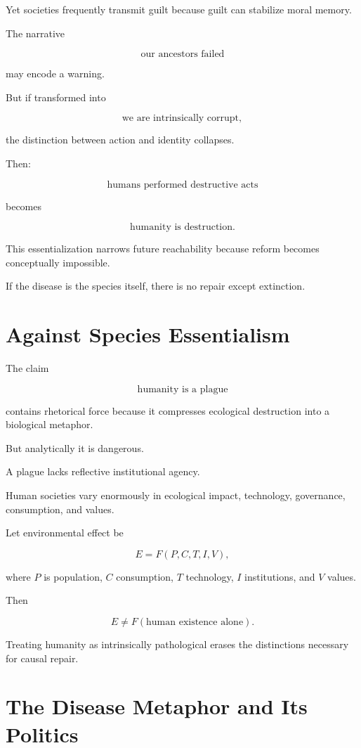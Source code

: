 \documentclass[11pt,oneside]{book}
\theoremstyle{definition}
\theoremstyle{remark}
\begin{document}
Yet societies frequently transmit guilt because guilt can stabilize moral memory.

The narrative

\[
\text{our ancestors failed}
\]

may encode a warning.

But if transformed into

\[
\text{we are intrinsically corrupt},
\]

the distinction between action and identity collapses.

Then:

\[
\text{humans performed destructive acts}
\]

becomes

\[
\text{humanity is destruction}.
\]

This essentialization narrows future reachability because reform becomes conceptually impossible.

If the disease is the species itself, there is no repair except extinction.

\section{Against Species Essentialism}

The claim

\[
\text{humanity is a plague}
\]

contains rhetorical force because it compresses ecological destruction into a biological metaphor.

But analytically it is dangerous.

A plague lacks reflective institutional agency.

Human societies vary enormously in ecological impact, technology, governance, consumption, and values.

Let environmental effect be

\[
E
=
F(P,C,T,I,V),
\]

where \(P\) is population, \(C\) consumption, \(T\) technology, \(I\) institutions, and \(V\) values.

Then

\[
E\neq F(\text{human existence alone}).
\]

Treating humanity as intrinsically pathological erases the distinctions necessary for causal repair.

\section{The Disease Metaphor and Its Politics}
\end{document}
